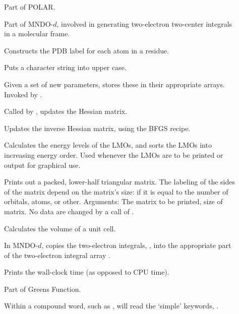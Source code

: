 \begin{description}
\item[] Part of POLAR.

\item[] Part of MNDO-$d$, involved in generating two-electron
two-center integrals in a molecular frame.

\item[] Constructs the PDB label for each atom in a residue.

\item[] Puts a character string into upper case.

\item[] Given a set of new parameters, stores these  in their
appropriate arrays.  Invoked by .

\item[] Called by ,  updates the Hessian
matrix.

\item[] Updates the inverse Hessian matrix, using the BFGS recipe.

\item[] Calculates the energy levels of the LMOs, and sorts
the LMOs into increasing energy order.  Used whenever the LMOs are to be
printed or output for graphical use.

\item[] Prints out a packed, lower-half
triangular matrix.  The labeling of the sides of the matrix depend on the
matrix's size: if it is equal to the number of orbitals, atoms, or other.
Arguments: The matrix to be printed, size of matrix. No data are changed by a
call of .

\item[] Calculates the volume of a unit cell.

\item[] In MNDO-$d$, copies the two-electron integrals, ,
into the appropriate part of the two-electron integral array .

\item[] Prints the wall-clock time (as opposed to CPU time).

\item[] Part of Greens Function.

\item[] Within a compound word, such as ,
 will read the `simple' keywords, .


\end{description}
